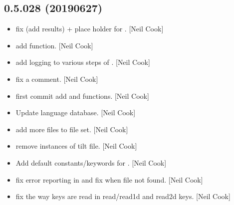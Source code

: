 \documentclass[a4paper,10pt,english]{report}
\begin{document}
\subsection{0.5.028 (2019\sphinxhyphen{}06\sphinxhyphen{}27)}
\label{\detokenize{misc/changelog:id127}}\begin{itemize}
\item {} 
 \sphinxhyphen{} fix  (add 
results) + place holder for . {[}Neil Cook{]}

\item {} 
 \sphinxhyphen{} add  function. {[}Neil
Cook{]}

\item {} 
 \sphinxhyphen{} add logging to various steps of
. {[}Neil Cook{]}

\item {} 
 \sphinxhyphen{} fix a comment. {[}Neil Cook{]}

\item {} 
 \sphinxhyphen{} first commit add  and
 functions. {[}Neil Cook{]}

\item {} 
Update language database. {[}Neil Cook{]}

\item {} 
 \sphinxhyphen{} add more files to  file set. {[}Neil Cook{]}

\item {} 
 \sphinxhyphen{} remove instances of tilt file. {[}Neil Cook{]}

\item {} 
Add default constants/keywords for . {[}Neil Cook{]}

\item {} 
 \sphinxhyphen{} fix error reporting in  and fix
 when file not found. {[}Neil Cook{]}

\item {} 
 \sphinxhyphen{} fix the way keys are read in read/read1d and read2d
keys. {[}Neil Cook{]}


\end{itemize}
\end{document}
